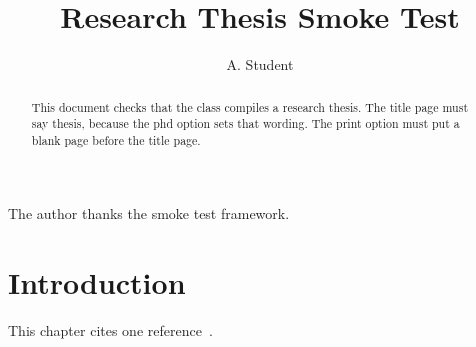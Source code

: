 \documentclass[phd,print,12pt,a4paper]{bangor}
\title{Research Thesis Smoke Test}
\author{A. Student}
\begin{document}
\maketitle
\statementspage
\begin{acknowledgements}
  The author thanks the smoke test framework.
\end{acknowledgements}
\begin{abstract}
  This document checks that the class compiles a research thesis. The
  title page must say thesis, because the phd option sets that wording.
  The print option must put a blank page before the title page.
\end{abstract}
\tables
\chapter{Introduction}
This chapter cites one reference~\autocite{knuth1984}.
\printbibliography
\end{document}

